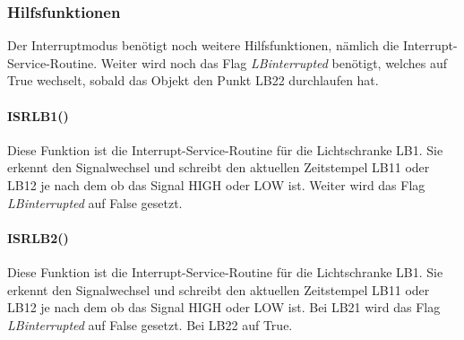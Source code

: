 \subsubsection{Hilfsfunktionen}
Der Interruptmodus benötigt noch weitere Hilfsfunktionen, nämlich die Interrupt-Service-Routine. Weiter wird noch das Flag  \textit{LBinterrupted} benötigt, welches auf True wechselt, sobald das Objekt den Punkt LB22 durchlaufen hat.\\


\paragraph{ISRLB1()}
Diese Funktion ist die Interrupt-Service-Routine für die Lichtschranke LB1. Sie erkennt den Signalwechsel und schreibt den aktuellen Zeitstempel LB11 oder LB12 je nach dem ob das Signal HIGH oder LOW ist. Weiter wird das Flag \textit{LBinterrupted} auf False gesetzt.\\


\paragraph{ISRLB2()}
Diese Funktion ist die Interrupt-Service-Routine für die Lichtschranke LB1. Sie erkennt den Signalwechsel und schreibt den aktuellen Zeitstempel LB11 oder LB12 je nach dem ob das Signal HIGH oder LOW ist. Bei LB21 wird das Flag \textit{LBinterrupted} auf False gesetzt. Bei LB22 auf True.\\


%
%
%
%
